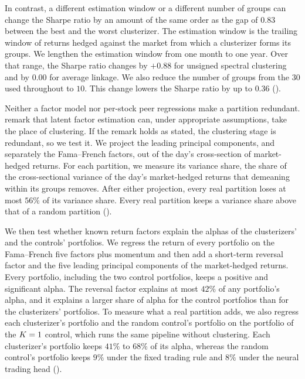 In contrast, a different estimation window or a different number of groups can change the Sharpe ratio by an amount of the same order as the gap of $0.83$ between the best and the worst clusterizer. The estimation window is the trailing window of returns hedged against the market from which a clusterizer forms its groups.  We lengthen the estimation window from one month to one year. Over that range, the Sharpe ratio changes by $+0.88$ for unsigned spectral clustering and by $0.00$ for average linkage. We also reduce the number of groups from the $30$ used throughout to $10$. This change lowers the Sharpe ratio by up to $0.36$ ().

Neither a factor model nor per-stock peer regressions make a partition redundant. \citet{guijarro2025deep} remark that latent factor estimation can, under appropriate assumptions, take the place of clustering. If the remark holds as stated, the clustering stage is redundant, so we test it. We project the leading principal components, and separately the Fama--French factors, out of the day's cross-section of market-hedged returns. For each partition, we measure its variance share, the share of the cross-sectional variance of the day's market-hedged returns that demeaning within its groups removes. After either projection, every real partition loses at most $56\%$ of its variance share. Every real partition keeps a variance share above that of a random partition ().

We then test whether known return factors explain the alphas of the clusterizers' and the controls' portfolios. We regress the return of every portfolio on the Fama--French five factors plus momentum and then add a short-term reversal factor and the five leading principal components of the market-hedged returns. Every portfolio, including the two control portfolios, keeps a positive and significant alpha. The reversal factor explains at most $42\%$ of any portfolio's alpha, and it explains a larger share of alpha for the control portfolios than for the clusterizers' portfolios. To measure what a real partition adds, we also regress each clusterizer's portfolio and the random control's portfolio on the portfolio of the $K=1$ control, which runs the same pipeline without clustering. Each clusterizer's portfolio keeps $41\%$ to $68\%$ of its alpha, whereas the random control's portfolio keeps $9\%$ under the fixed trading rule and $8\%$ under the neural trading head ().

